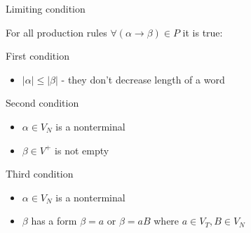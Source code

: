 \documentclass{beamer}
\begin{document}
\begin{frame}{Limiting condition}

For all production rules $\forall (\alpha \rightarrow \beta)\in P$ it is true:

\begin{block}{First condition}
	\begin{itemize}
		\item $|\alpha| \leq |\beta|$ - they don't decrease length of a word
	\end{itemize}

\end{block}

\begin{block}{Second condition}
	\begin{itemize}
		\item $\alpha\in V_N$ is a nonterminal
		\item $\beta\in V^{+}$ is not empty
	\end{itemize}
\end{block}

\begin{block}{Third condition}
	\begin{itemize}
		\item $\alpha\in V_N$ is a nonterminal
		\item $\beta$ has a form $\beta=a$ or $\beta=aB$ where $a\in V_T, B\in V_N$
	\end{itemize}
\end{block}

\end{frame}
\end{document}
